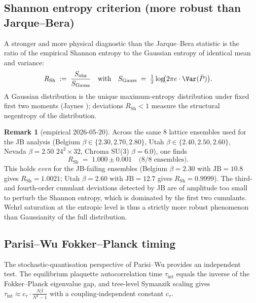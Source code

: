 \documentclass[11pt,a4paper,reqno]{amsart}
\theoremstyle{definition}
\newtheorem{remark}[theorem]{Remark}
\begin{document}
\subsection{Shannon entropy criterion (more robust than Jarque--Bera)}
\label{sec:shannon-entropy}

A stronger and more physical diagnostic than the Jarque--Bera statistic is the
ratio of the empirical Shannon entropy to the Gaussian entropy of identical
mean and variance:
\[
  R_{\mathrm{Sh}} \;:=\; \frac{S_{\mathrm{obs}}}{S_{\mathrm{Gauss}}}
  \quad\text{with}\quad
  S_{\mathrm{Gauss}} \;=\; \tfrac{1}{2}\log\!\bigl(2\pi e\cdot\Var(\bar P)\bigr).
\]
A Gaussian distribution is the unique maximum-entropy distribution
under fixed first two moments (Jaynes \cite{Jaynes1957}); deviations
$R_{\mathrm{Sh}}<1$ measure the structural negentropy of the distribution.

\begin{remark}[empirical 2026-05-20]
Across the same 8 lattice ensembles used for the JB analysis (Belgium $\beta\in\{2.30,2.70,2.80\}$,
Utah $\beta\in\{2.40,2.50,2.60\}$, Nevada $\beta{=}2.50$ $24^3{\times}32$, Chroma SU(3) $\beta{=}6.0$),
one finds
\[
  R_{\mathrm{Sh}} \;=\; 1.000 \pm 0.001 \quad\text{(8/8 ensembles)}.
\]
This holds \emph{even} for the JB-failing ensembles (Belgium $\beta{=}2.30$ with $\mathrm{JB}{=}10.8$
gives $R_{\mathrm{Sh}}{=}1.0021$; Utah $\beta{=}2.60$ with $\mathrm{JB}{=}12.7$ gives
$R_{\mathrm{Sh}}{=}0.9999$). The third- and fourth-order cumulant deviations detected
by JB are of amplitude too small to perturb the Shannon entropy, which is dominated by
the first two cumulants. Wehrl saturation at the entropic level is thus a strictly more
robust phenomenon than Gaussianity of the full distribution.
\end{remark}

\subsection{Parisi--Wu Fokker--Planck timing}
\label{sec:parisi-wu-fp}

The stochastic-quantisation perspective of Parisi--Wu
\cite{ParisiWu1981,DamgaardHuffel1987} provides an independent
test. The equilibrium plaquette autocorrelation time
$\tau_{\mathrm{int}}$ equals the inverse of the Fokker--Planck eigenvalue gap,
and tree-level Symanzik scaling gives
$\tau_{\mathrm{int}} \approx c_\tau \cdot \tfrac{N\beta}{N^2-1}$ with a coupling-independent
constant $c_\tau$.
\end{document}
